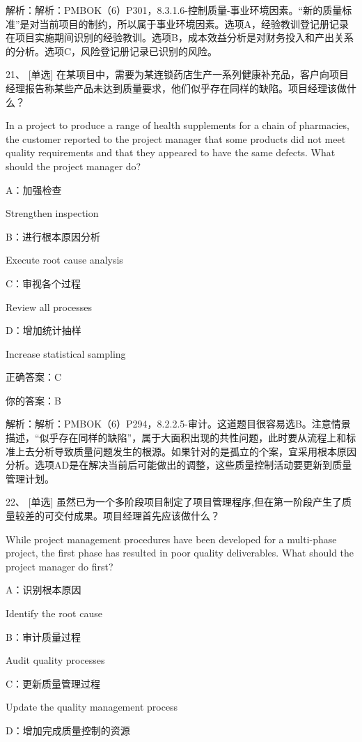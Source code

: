 解析：解析：PMBOK（6）P301，8.3.1.6-控制质量-事业环境因素。“新的质量标准”是对当前项目的制约，所以属于事业环境因素。选项A，经验教训登记册记录在项目实施期间识别的经验教训。选项B，成本效益分析是对财务投入和产出关系的分析。选项C，风险登记册记录已识别的风险。



21、 [单选] 在某项目中，需要为某连锁药店生产一系列健康补充品，客户向项目经理报告称某些产品未达到质量要求，他们似乎存在同样的缺陷。项目经理该做什么？

In a project to produce a range of health supplements for a chain of pharmacies, the customer reported to the project manager that some products did not meet quality requirements and that they appeared to have the same defects. What should the project manager do?

A：加强检查

Strengthen inspection

B：进行根本原因分析

Execute root cause analysis

C：审视各个过程

Review all processes

D：增加统计抽样

Increase statistical sampling

正确答案：C

你的答案：B

解析：解析：PMBOK（6）P294，8.2.2.5-审计。这道题目很容易选B。注意情景描述，“似乎存在同样的缺陷”，属于大面积出现的共性问题，此时要从流程上和标准上去分析导致质量问题发生的根源。如果针对的是孤立的个案，宜采用根本原因分析。选项AD是在解决当前后可能做出的调整，这些质量控制活动要更新到质量管理计划。


22、 [单选] 虽然已为一个多阶段项目制定了项目管理程序,但在第一阶段产生了质量较差的可交付成果。项目经理首先应该做什么？

While project management procedures have been developed for a multi-phase project, the first phase has resulted in poor quality deliverables. What should the project manager do first?

A：识别根本原因

Identify the root cause

B：审计质量过程

Audit quality processes

C：更新质量管理过程

Update the quality management process

D：增加完成质量控制的资源

